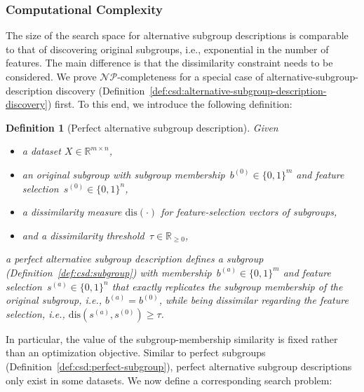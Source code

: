 \documentclass[acmsmall]{acmart} %
\theoremstyle{acmplain}
\theoremstyle{acmdefinition}
\newtheorem{definition}{Definition}
\begin{document}
\subsubsection{Computational Complexity}
\label{sec:csd:approach:alternatives:complexity}

The size of the search space for alternative subgroup descriptions is comparable to that of discovering original subgroups, i.e., exponential in the number of features.
The main difference is that the dissimilarity constraint needs to be considered.
We prove $\mathcal{NP}$-completeness for a special case of alternative-subgroup-description discovery (Definition~\ref{def:csd:alternative-subgroup-description-discovery}) first.
To this end, we introduce the following definition:
%
\begin{definition}[Perfect alternative subgroup description]
	Given
	\begin{itemize}[noitemsep]
		\item a dataset $X \in \mathbb{R}^{m \times n}$,
		\item an original subgroup with subgroup membership~$b^{(0)} \in \{0, 1\}^m$ and feature selection~$s^{(0)} \in \{0, 1\}^n$,
		\item a dissimilarity measure $\text{dis}(\cdot)$ for feature-selection vectors of subgroups,
		\item and a dissimilarity threshold~$\tau \in \mathbb{R}_{\geq 0}$,
	\end{itemize}
	a \emph{perfect alternative subgroup description} defines a subgroup (Definition~\ref{def:csd:subgroup}) with membership~$b^{(a)} \in \{0, 1\}^m$ and feature selection~$s^{(a)} \in \{0, 1\}^n$ that exactly replicates the subgroup membership of the original subgroup, i.e., $b^{(a)} = b^{(0)}$, while being dissimilar regarding the feature selection, i.e., $\text{dis}(s^{(a)}, s^{(0)}) \geq \tau$.
	\label{def:csd:perfect-alternative}
\end{definition}
%
In particular, the value of the subgroup-membership similarity is fixed rather than an optimization objective.
Similar to perfect subgroups (Definition~\ref{def:csd:perfect-subgroup}), perfect alternative subgroup descriptions only exist in some datasets. 
We now define a corresponding search problem:
%
\end{document}
